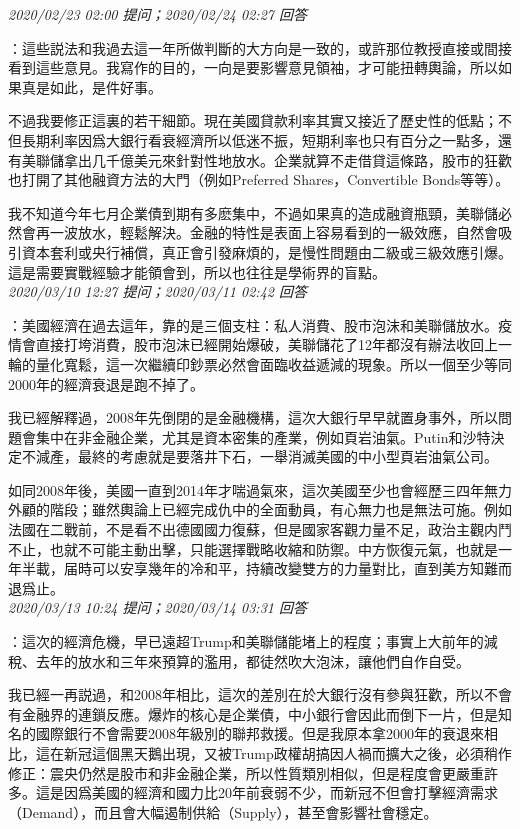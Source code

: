 \documentclass[twocolumn]{ctexart}
\begin{document}
\textit{\hfill\noindent\small 2020/02/23 02:00 提问；2020/02/24 02:27 回答}

：這些説法和我過去這一年所做判斷的大方向是一致的，或許那位教授直接或間接看到這些意見。我寫作的目的，一向是要影響意見領袖，才可能扭轉輿論，所以如果真是如此，是件好事。

不過我要修正這裏的若干細節。現在美國貸款利率其實又接近了歷史性的低點；不但長期利率因爲大銀行看衰經濟所以低迷不振，短期利率也只有百分之一點多，還有美聯儲拿出几千億美元來針對性地放水。企業就算不走借貸這條路，股市的狂歡也打開了其他融資方法的大門（例如Preferred Shares，Convertible Bonds等等）。

我不知道今年七月企業債到期有多麽集中，不過如果真的造成融資瓶頸，美聯儲必然會再一波放水，輕鬆解決。金融的特性是表面上容易看到的一級效應，自然會吸引資本套利或央行補償，真正會引發麻煩的，是慢性問題由二級或三級效應引爆。這是需要實戰經驗才能領會到，所以也往往是學術界的盲點。
\\

\textit{\hfill\noindent\small 2020/03/10 12:27 提问；2020/03/11 02:42 回答}

：美國經濟在過去這年，靠的是三個支柱：私人消費、股市泡沫和美聯儲放水。疫情會直接打垮消費，股市泡沫已經開始爆破，美聯儲花了12年都沒有辦法收回上一輪的量化寬鬆，這一次繼續印鈔票必然會面臨收益遞減的現象。所以一個至少等同2000年的經濟衰退是跑不掉了。

我已經解釋過，2008年先倒閉的是金融機構，這次大銀行早早就置身事外，所以問題會集中在非金融企業，尤其是資本密集的產業，例如頁岩油氣。Putin和沙特決定不減產，最終的考慮就是要落井下石，一舉消滅美國的中小型頁岩油氣公司。

如同2008年後，美國一直到2014年才喘過氣來，這次美國至少也會經歷三四年無力外顧的階段；雖然輿論上已經完成仇中的全面動員，有心無力也是無法可施。例如法國在二戰前，不是看不出德國國力復蘇，但是國家客觀力量不足，政治主觀内鬥不止，也就不可能主動出擊，只能選擇戰略收縮和防禦。中方恢復元氣，也就是一年半載，届時可以安享幾年的冷和平，持續改變雙方的力量對比，直到美方知難而退爲止。
\\

\textit{\hfill\noindent\small 2020/03/13 10:24 提问；2020/03/14 03:31 回答}

：這次的經濟危機，早已遠超Trump和美聯儲能堵上的程度；事實上大前年的減稅、去年的放水和三年來預算的濫用，都徒然吹大泡沫，讓他們自作自受。

我已經一再説過，和2008年相比，這次的差別在於大銀行沒有參與狂歡，所以不會有金融界的連鎖反應。爆炸的核心是企業債，中小銀行會因此而倒下一片，但是知名的國際銀行不會需要2008年級別的聯邦救援。但是我原本拿2000年的衰退來相比，這在新冠這個黑天鵝出現，又被Trump政權胡搞因人禍而擴大之後，必須稍作修正：震央仍然是股市和非金融企業，所以性質類別相似，但是程度會更嚴重許多。這是因爲美國的經濟和國力比20年前衰弱不少，而新冠不但會打擊經濟需求（Demand），而且會大幅遏制供給（Supply），甚至會影響社會穩定。
\\
\end{document}
